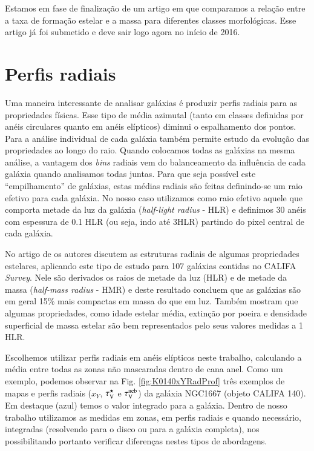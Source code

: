 Estamos em fase de finalização de um artigo em que comparamos a relação entre a taxa de formação
estelar e a massa para diferentes classes morfológicas. Esse artigo já foi submetido e deve sair
logo agora no início de 2016.

\section{Perfis radiais}
\label{sec:amostra:rad}

Uma maneira interessante de analisar galáxias é produzir perfis radiais para as propriedades
físicas. Esse tipo de média azimutal (tanto em classes definidas por anéis circulares quanto em
anéis elípticos) diminui o espalhamento dos pontos. Para a análise individual de cada galáxia também
permite estudo da evolução das propriedades ao longo do raio. Quando colocamos todas as galáxias na
mesma análise, a vantagem dos {\em bins} radiais vem do balanceamento da influência de cada galáxia
quando analisamos todas juntas. Para que seja possível este ``empilhamento'' de galáxias, estas
médias radiais são feitas definindo-se um raio efetivo para cada galáxia. No nosso caso utilizamos
como raio efetivo aquele que comporta metade da luz da galáxia ({\em half-light radius} - HLR) e
definimos 30 anéis com espessura de 0.1 HLR (ou seja, indo até 3HLR) partindo do pixel central de
cada galáxia.

No artigo de \citet{GonzalezDelgado.etal.2014a} os autores discutem as estruturas radiais de algumas
propriedades estelares, aplicando este tipo de estudo para 107 galáxias contidas no CALIFA {\em
Survey}. Nele são derivados os raios de metade da luz (HLR) e de metade da massa ({\em half-mass
radius} - HMR) e deste resultado concluem que as galáxias são em geral 15\% mais compactas em massa
do que em luz. Também mostram que algumas propriedades, como idade estelar média, extinção por
poeira e densidade superficial de massa estelar são bem representados pelo seus valores medidas a 1
HLR.

Escolhemos utilizar perfis radiais em anéis elípticos neste trabalho, calculando a média entre todas
as zonas não mascaradas dentro de cana anel. Como um exemplo, podemos observar na Fig.
\ref{fig:K0140xYRadProf} três exemplos de mapas e perfis radiais ($x_Y$, $\tau_{\mathrm{V}}^\star$ e $\tau_{\mathrm{V}}^{\mathrm{neb}}$) da
galáxia NGC1667 (objeto CALIFA 140). Em destaque (azul) temos o valor integrado para a galáxia.
Dentro de nosso trabalho utilizamos as medidas em zonas, em perfis radiais e quando necessário,
integradas (resolvendo para o disco ou para a galáxia completa), nos possibilitando portanto
verificar diferenças nestes tipos de abordagens.

